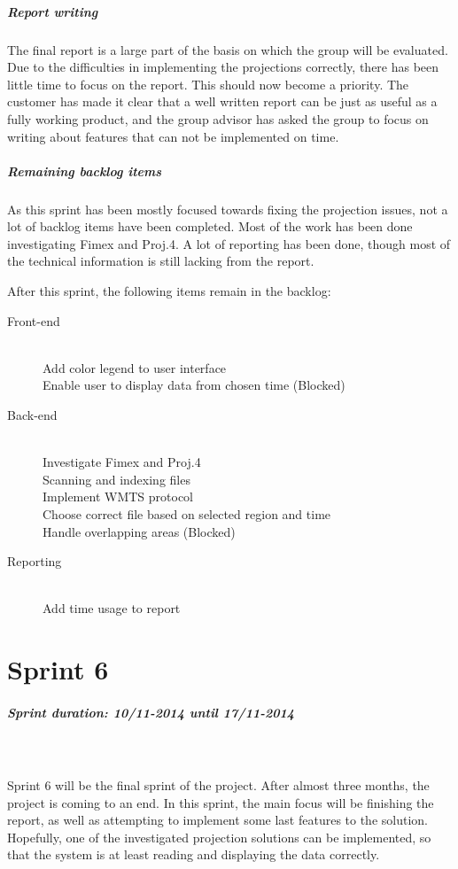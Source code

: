 \documentclass[11pt,a4paper,titlepage,oneside]{report}
\begin{document}
\paragraph{Report writing}
The final report is a large part of the basis on which the group will be evaluated. Due to the difficulties in implementing the projections correctly, there has been little time to focus on the report. This should now become a priority. The customer has made it clear that a well written report can be just as useful as a fully working product, and the group advisor has asked the group to focus on writing about features that can not be implemented on time. 

\paragraph{Remaining backlog items}
As this sprint has been mostly focused towards fixing the projection issues, not a lot of backlog items have been completed. Most of the work has been done investigating \gls{Fimex} and Proj.4. A lot of reporting has been done, though most of the technical information is still lacking from the report. 

After this sprint, the following items remain in the backlog:

\begin{description}
	\item[Front-end] \hfill \\
	Add color legend to user interface \hfill \\
	Enable user to display data from chosen time (Blocked)
	\item[Back-end] \hfill \\
	Investigate \gls{Fimex} and Proj.4 \hfill \\
	Scanning and indexing files \hfill \\
	Implement \gls{WMTS} \gls{protocol} \hfill \\
	Choose correct file based on selected region and time \hfill \\
	Handle overlapping areas (Blocked)
	\item[Reporting] \hfill \\
	Add time usage to report
\end{description}

\chapter{Sprint 6}
\paragraph{Sprint duration: 10/11-2014 until 17/11-2014} \hfill \\
\\
\noindent
Sprint 6 will be the final sprint of the project. After almost three months, the project is coming to an end. In this sprint, the main focus will be finishing the report, as well as attempting to implement some last features to the solution. Hopefully, one of the investigated projection solutions can be implemented, so that the system is at least reading and displaying the data correctly.
\end{document}
